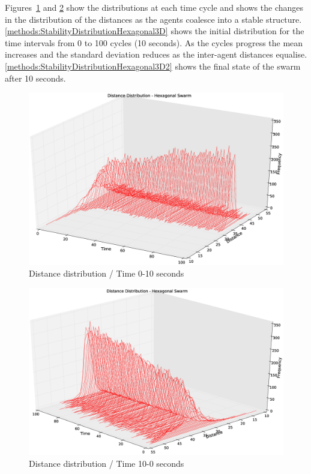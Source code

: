 Figures~\ref{methods:StabilityDistributionHexagonal3D} and \ref{methods:StabilityDistributionHexagonal3D2} show the distributions at each time cycle and shows the changes in the distribution of the distances as the agents coalesce into a stable structure. \autoref{methods:StabilityDistributionHexagonal3D} shows the initial distribution for the time intervals from 0 to 100 cycles (10 seconds). As the cycles progress the mean increases and the standard deviation reduces as the inter-agent distances equalise. \autoref{methods:StabilityDistributionHexagonal3D2} shows the final state of the swarm after 10 seconds.
\begin{figure}[H]
\includegraphics[width=15cm]{CHAPTER-5/figures/StabilityDistibutionHexagonal3D}
\caption{Distance distribution / Time 0-10 seconds\label{methods:StabilityDistributionHexagonal3D}}
\end{figure}

\begin{figure}[H]
\includegraphics[width=15cm]{CHAPTER-5/figures/StabilityDistibutionHexagonal3D2}
\caption{Distance distribution / Time 10-0 seconds\label{methods:StabilityDistributionHexagonal3D2}}
\end{figure}

